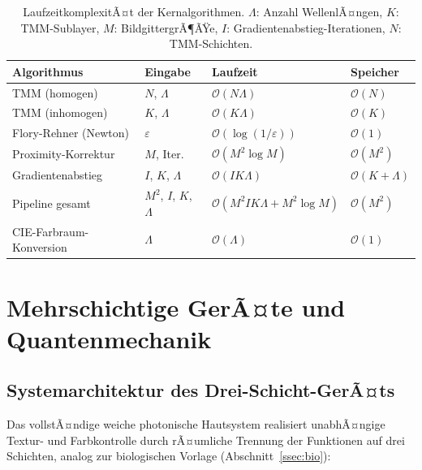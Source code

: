 ﻿\documentclass[a4paper,12pt]{article}
\theoremstyle{definition}
\newcommand{\ordre}[1]{\mathcal{O}\!\left(#1\right)}
\begin{document}
	\begin{table}[htb]
		\centering
		\caption{LaufzeitkomplexitÃ¤t der Kernalgorithmen.
			$\Lambda$: Anzahl WellenlÃ¤ngen, $K$: TMM-Sublayer, $M$: BildgittergrÃ¶ÃŸe,
			$I$: Gradientenabstieg-Iterationen, $N$: TMM-Schichten.}
		\label{tab:komplexitaet}
		\begin{tabular}{llll}
			\toprule
			\textbf{Algorithmus} & \textbf{Eingabe} & \textbf{Laufzeit} & \textbf{Speicher}\\
			\midrule
			TMM (homogen) & $N$, $\Lambda$ & $\ordre{N\Lambda}$ & $\ordre{N}$\\
			TMM (inhomogen) & $K$, $\Lambda$ & $\ordre{K\Lambda}$ & $\ordre{K}$\\
			Flory-Rehner (Newton) & $\varepsilon$ & $\ordre{\log(1/\varepsilon)}$ & $\ordre{1}$\\
			Proximity-Korrektur & $M$, Iter. & $\ordre{M^2\log M}$ & $\ordre{M^2}$\\
			Gradientenabstieg & $I$, $K$, $\Lambda$ & $\ordre{I K\Lambda}$ & $\ordre{K+\Lambda}$\\
			Pipeline gesamt & $M^2$, $I$, $K$, $\Lambda$ & $\ordre{M^2 I K\Lambda + M^2\log M}$ & $\ordre{M^2}$\\
			CIE-Farbraum-Konversion & $\Lambda$ & $\ordre{\Lambda}$ & $\ordre{1}$\\
			\bottomrule
		\end{tabular}
	\end{table}
	
	\section{Mehrschichtige GerÃ¤te und Quantenmechanik}
	\label{sec:mehrschicht}
	
	\subsection{Systemarchitektur des Drei-Schicht-GerÃ¤ts}
	
	Das vollstÃ¤ndige weiche photonische Hautsystem realisiert unabhÃ¤ngige
	Textur- und Farbkontrolle durch rÃ¤umliche Trennung der Funktionen auf
	drei Schichten, analog zur biologischen Vorlage (Abschnitt~\ref{ssec:bio}):
	
\end{document}
